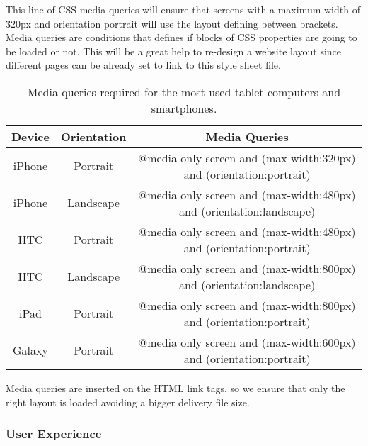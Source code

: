 This line of CSS media queries will ensure that screens with a maximum width of 320px and orientation portrait will use the layout defining between brackets. Media queries are conditions that defines if blocks of CSS properties are going to be loaded or not. This will be a great help to re-design a website layout since different pages can be already set to link to this style sheet file. \\

\begin{table}[!h]
	\begin{tabular}{| c | c | c |}
	\hline
	\textbf{Device} & \textbf{Orientation} & \textbf{Media Queries} \\ \hline
	iPhone & Portrait & @media only screen and (max-width:320px) and (orientation:portrait)\\ \hline
	iPhone & Landscape & @media only screen and (max-width:480px) and (orientation:landscape)\\ \hline
	HTC & Portrait & @media only screen and (max-width:480px) and (orientation:portrait)\\ \hline
	HTC & Landscape & @media only screen and (max-width:800px) and (orientation:landscape)\\ \hline
	iPad & Portrait & @media only screen and (max-width:800px) and (orientation:portrait)\\ \hline
	Galaxy & Portrait & @media only screen and (max-width:600px) and (orientation:portrait)\\
	\hline
	\end{tabular}
	\caption{Media queries required for the most used tablet computers and smartphones.}
\end{table}

Media queries are inserted on the HTML link tags, so we ensure that only the right layout is loaded avoiding a bigger delivery file size.

\subsubsection{User Experience}	    %

